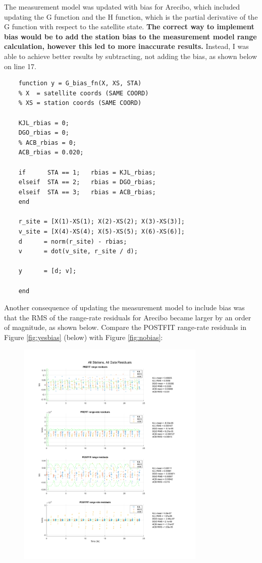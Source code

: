 \documentclass[conf]{new-aiaa}
\begin{document}
The measurement model was updated with bias for Arecibo, which included updating the G function and the H function, which is the partial derivative of the G function with respect to the satellite state. \textbf{The correct way to implement bias would be to add the station bias to the measurement model range calculation, however this led to more inaccurate results.} Instead, I was able to achieve better results by subtracting, not adding the bias, as shown below on line 17. 

\begin{lstlisting}
	function y = G_bias_fn(X, XS, STA)
	% X  = satellite coords (SAME COORD)
	% XS = station coords (SAME COORD)
	
	KJL_rbias = 0;  
	DGO_rbias = 0; 
	% ACB_rbias = 0; 
	ACB_rbias = 0.020; 
	
	if      STA == 1;   rbias = KJL_rbias;   
	elseif  STA == 2;   rbias = DGO_rbias;   
	elseif  STA == 3;   rbias = ACB_rbias;   
	end
	
	r_site = [X(1)-XS(1); X(2)-XS(2); X(3)-XS(3)]; 
	v_site = [X(4)-XS(4); X(5)-XS(5); X(6)-XS(6)]; 
	d      = norm(r_site) - rbias; 
	v      = dot(v_site, r_site / d); 
	
	y      = [d; v]; 
	
	end 
\end{lstlisting}

Another consequence of updating the measurement model to include bias was that the RMS of the range-rate residuals for Arecibo became larger by an order of magnitude, as shown below. Compare the POSTFIT range-rate residuals in Figure \ref{fig:yesbias} (below) with Figure \ref{fig:nobias}: 

\begin{figure}[H]
	\centering
	\includegraphics[width=0.8\textwidth]{yesbias.png}
\end{figure}
\label{fig:yesbias}
\end{document}
